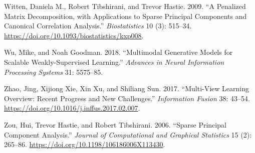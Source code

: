\documentclass[
  10pt,
  letterpaper,
]{report}
\newlength{\cslhangindent}
\newenvironment{CSLReferences}[2] %
 {\begin{list}{}{%
  \setlength{\itemindent}{0pt}
  \setlength{\leftmargin}{0pt}
  \setlength{\parsep}{0pt}
  \ifodd #1
   \setlength{\leftmargin}{\cslhangindent}
   \setlength{\itemindent}{-1\cslhangindent}
  \fi
  \setlength{\itemsep}{#2\baselineskip}}}
 {\end{list}}
\begin{document}
\begin{CSLReferences}{1}{1}
Witten, Daniela M., Robert Tibshirani, and Trevor Hastie. 2009. {``A
Penalized Matrix Decomposition, with Applications to Sparse Principal
Components and Canonical Correlation Analysis.''} \emph{Biostatistics}
10 (3): 515--34. \url{https://doi.org/10.1093/biostatistics/kxp008}.

Wu, Mike, and Noah Goodman. 2018. {``Multimodal Generative Models for
Scalable Weakly-Supervised Learning.''} \emph{Advances in Neural
Information Processing Systems} 31: 5575--85.

Zhao, Jing, Xijiong Xie, Xin Xu, and Shiliang Sun. 2017. {``Multi-View
Learning Overview: Recent Progress and New Challenges.''}
\emph{Information Fusion} 38: 43--54.
\url{https://doi.org/10.1016/j.inffus.2017.02.007}.

Zou, Hui, Trevor Hastie, and Robert Tibshirani. 2006. {``Sparse
Principal Component Analysis.''} \emph{Journal of Computational and
Graphical Statistics} 15 (2): 265--86.
\url{https://doi.org/10.1198/106186006X113430}.

\end{CSLReferences}
\end{document}
